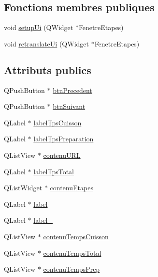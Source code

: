 \subsection*{Fonctions membres publiques}
\begin{DoxyCompactItemize}
\item 
void \hyperlink{class_ui___fenetre_etapes_a5bf35503b72beb223e5a03ea046524a1}{setup\+Ui} (Q\+Widget $\ast$Fenetre\+Etapes)
\item 
void \hyperlink{class_ui___fenetre_etapes_a12b8a73438c7adfe883f9deb6af95426}{retranslate\+Ui} (Q\+Widget $\ast$Fenetre\+Etapes)
\end{DoxyCompactItemize}
\subsection*{Attributs publics}
\begin{DoxyCompactItemize}
\item 
Q\+Push\+Button $\ast$ \hyperlink{class_ui___fenetre_etapes_afd2c805beef4f8e6df60ba666e2d9e3e}{btn\+Precedent}
\item 
Q\+Push\+Button $\ast$ \hyperlink{class_ui___fenetre_etapes_ac4cd6163fd1066a242e7b2d7560317fa}{btn\+Suivant}
\item 
Q\+Label $\ast$ \hyperlink{class_ui___fenetre_etapes_a504cc9ecca60aa437626e850cae88c5b}{label\+Tps\+Cuisson}
\item 
Q\+Label $\ast$ \hyperlink{class_ui___fenetre_etapes_ab1994c36dbf7f67f539517c6431cb96b}{label\+Tps\+Preparation}
\item 
Q\+List\+View $\ast$ \hyperlink{class_ui___fenetre_etapes_aa24feeee1b3348435a83ec44571c5f25}{contenu\+U\+RL}
\item 
Q\+Label $\ast$ \hyperlink{class_ui___fenetre_etapes_a3c1c06d0dd2dde35c651ad430dc04bda}{label\+Tps\+Total}
\item 
Q\+List\+Widget $\ast$ \hyperlink{class_ui___fenetre_etapes_a5ca61918507e2eeef4e8e1d47467cc70}{contenu\+Etapes}
\item 
Q\+Label $\ast$ \hyperlink{class_ui___fenetre_etapes_a53eae32c579e7339b50f669828d704d3}{label}
\item 
Q\+Label $\ast$ \hyperlink{class_ui___fenetre_etapes_a58449e87895513ba9014273128385d91}{label\+\_}
\item 
Q\+List\+View $\ast$ \hyperlink{class_ui___fenetre_etapes_a135f3f5bd01ce6b6305b2c5fac8300b7}{contenu\+Temps\+Cuisson}
\item 
Q\+List\+View $\ast$ \hyperlink{class_ui___fenetre_etapes_a408df57a10027aa8dc496185822b0f22}{contenu\+Temps\+Total}
\item 
Q\+List\+View $\ast$ \hyperlink{class_ui___fenetre_etapes_ab6a00c484db7168498bffe4e8ccc5547}{contenu\+Temps\+Prep}
\end{DoxyCompactItemize}


